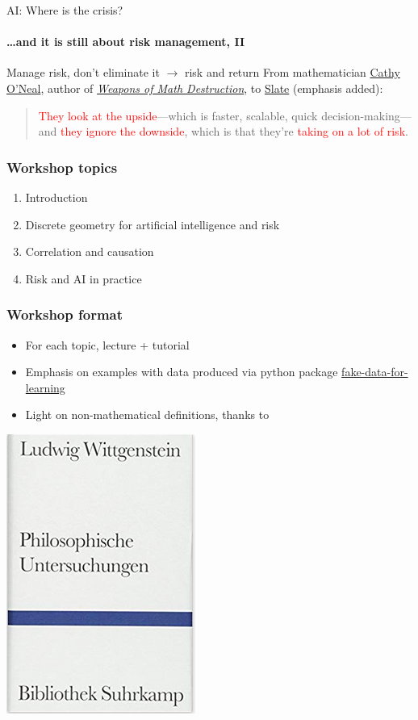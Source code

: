 \begin{frame}{AI: Where is the crisis?}
  \framesubtitle{\ldots and it is still about risk management, II}
  {\large Manage risk, don't eliminate it $\rightarrow$ risk and return}
  \newline
  \newline
  From mathematician \href{https://mathbabe.org/}{Cathy O'Neal}, author of \href{https://en.wikipedia.org/wiki/Weapons_of_Math_Destruction}{\textit{Weapons of Math Destruction}}, to \href{https://slate.com/business/2019/11/apple-card-credit-algorithm-bias-discrimination-women.html}{Slate} (emphasis added):
  \begin{quotation}
    \textcolor{red}{They look at the upside}—which is faster, scalable, quick decision-making—and \textcolor{red}{they ignore the downside}, which is that they're \textcolor{red}{taking on a lot of risk}.
  \end{quotation}

\end{frame}


\begin{frame}
\frametitle{Workshop topics}
\begin{enumerate}
\item Introduction
\item Discrete geometry for artificial intelligence and risk
\item Correlation and causation
\item Risk and AI in practice
\end{enumerate}
\end{frame}

\begin{frame}
\frametitle{Workshop format}

\begin{itemize}
\item For each topic, lecture + tutorial
\item Emphasis on examples with data produced via python package \href{https://munichpavel.github.io/fake-data-for-learning/}{fake-data-for-learning}
\item Light on non-mathematical definitions, thanks to
\end{itemize}
\centering
\includegraphics[width=0.3\textheight]{graphics/pi_wittgenstein}
\end{frame}

